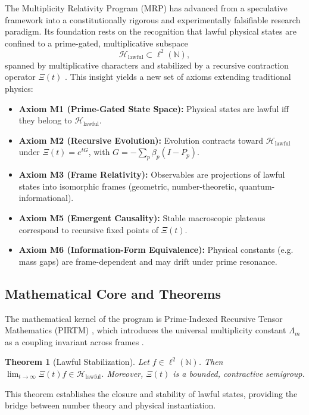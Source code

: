 \documentclass[12]{amsart}
\newtheorem{theorem}{Theorem}
\theoremstyle{plain}
\begin{document}
The Multiplicity Relativity Program (MRP) has advanced from a speculative framework into a constitutionally rigorous and experimentally falsifiable research paradigm. Its foundation rests on the recognition that lawful physical states are confined to a prime-gated, multiplicative subspace
\[
\mathcal{H}_{\text{lawful}} \subset \ell^2(\mathbb{N}),
\]
spanned by multiplicative characters and stabilized by a recursive contraction operator $\Xi(t)$ \cite{Edwards1974,Connes1999}. This insight yields a new set of axioms extending traditional physics:

\begin{itemize}
    \item \textbf{Axiom M1 (Prime-Gated State Space):} Physical states are lawful iff they belong to $\mathcal{H}_{\text{lawful}}$.
    \item \textbf{Axiom M2 (Recursive Evolution):} Evolution contracts toward $\mathcal{H}_{\text{lawful}}$ under $\Xi(t) = e^{tG}$, with $G = -\sum_p \beta_p (I - P_p)$.
    \item \textbf{Axiom M3 (Frame Relativity):} Observables are projections of lawful states into isomorphic frames (geometric, number-theoretic, quantum-informational).
    \item \textbf{Axiom M5 (Emergent Causality):} Stable macroscopic plateaus correspond to recursive fixed points of $\Xi(t)$.
    \item \textbf{Axiom M6 (Information-Form Equivalence):} Physical constants (e.g. mass gaps) are frame-dependent and may drift under prime resonance.
\end{itemize}

\subsection{Mathematical Core and Theorems}

The mathematical kernel of the program is Prime-Indexed Recursive Tensor Mathematics (PIRTM) \cite{CitizenGardens:2023a}, which introduces the universal multiplicity constant $\Lambda_m$ as a coupling invariant across frames \cite{CitizenGardens:2023c}. 

\begin{theorem}[Lawful Stabilization]
Let $f \in \ell^2(\mathbb{N})$. Then $\lim_{t \to \infty} \Xi(t) f \in \mathcal{H}_{\text{lawful}}$. Moreover, $\Xi(t)$ is a bounded, contractive semigroup.
\end{theorem}

This theorem establishes the closure and stability of lawful states, providing the bridge between number theory and physical instantiation.
\end{document}

